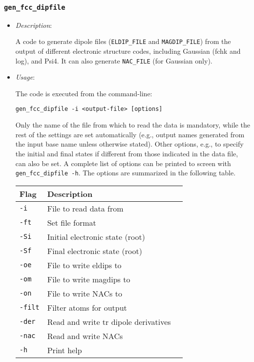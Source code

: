 \documentclass[a4paper,11pt]{article}
\begin{document}
\subsubsection{\texttt{gen\_fcc\_dipfile}}

\begin{itemize}
  \item[] \textit{Description}:

   A code to generate dipole files (\texttt{ELDIP\_FILE} and \texttt{MAGDIP\_FILE}) from the output of different electronic structure codes, including Gaussian (fchk and log), and Psi4. It can also generate \texttt{NAC\_FILE} (for Gaussian only).

   \item[] \textit{Usage}:

   The code is executed from the command-line:

   \texttt{gen\_fcc\_dipfile -i <output-file> [options]}

   Only the name of the file from which to read the data is mandatory, while the rest of the settings are set automatically (e.g., output names generated from the input base name unless otherwise stated). Other options, e.g., to specify the initial and final states if different from those indicated in the data file, can also be set. A complete list of options can be printed to screen with \texttt{gen\_fcc\_dipfile -h}. The options are summarized in the following table.

   \begin{tabular}{lll}
    Flag & Description  \\\hline
 \texttt{-i}    & File to read data from     \\
 \texttt{-ft}   & Set file format            \\
 \texttt{-Si}   & Initial electronic state (root)  \\
 \texttt{-Sf}   & Final electronic state (root)     \\
 \texttt{-oe}   & File to write eldips to     \\
 \texttt{-om}   & File to write magdips to     \\
 \texttt{-on}   & File to write NACs to   \\
 \texttt{-filt} & Filter atoms for output    \\
 \texttt{-der}  & Read and write tr dipole derivatives    \\
 \texttt{-nac}  & Read and write NACs \\
 \texttt{-h}    & Print help\\ \hline
 \hline
   \end{tabular}


 \end{itemize}
\end{document}
